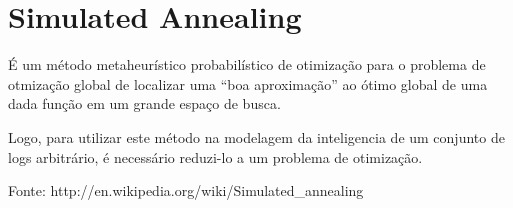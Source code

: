 \section{Simulated Annealing}

É um método metaheurístico probabilístico de otimização para o problema
de otmização global de localizar uma ``boa aproximação'' ao ótimo global
de uma dada função em um grande espaço de busca.

Logo, para utilizar este método na modelagem da inteligencia de um
conjunto de logs arbitrário, é necessário reduzi-lo a um problema de
otimização.

Fonte: http://en.wikipedia.org/wiki/Simulated\_annealing
